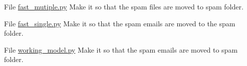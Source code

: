 
\begin{DoxyRefList}
\item[File \mbox{\hyperlink{fast__mutiple_8py}{fast\+\_\+mutiple.py}} ]\label{todo__todo000001}%
%
Make it so that the spam files are moved to spam folder.  
\item[File \mbox{\hyperlink{fast__single_8py}{fast\+\_\+single.py}} ]\label{todo__todo000002}%
%
Make it so that the spam emails are moved to the spam folder.  
\item[File \mbox{\hyperlink{working__model_8py}{working\+\_\+model.py}} ]\label{todo__todo000003}%
%
Make it so that the spam emails are moved to spam folder. 
\end{DoxyRefList}